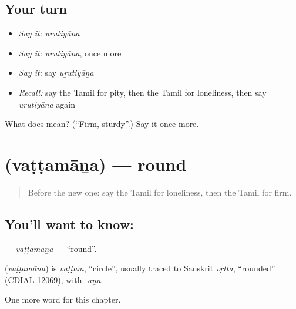 \subsection*{Your turn}
\begin{itemize}
\raggedright
  \item \emph{Say it:} \emph{uṟutiyāṉa}
  \item \emph{Say it:} \emph{uṟutiyāṉa}, once more
  \item \emph{Say it:} say \emph{uṟutiyāṉa}
  \item \emph{Recall:} say the Tamil for pity, then the Tamil for loneliness, then say \emph{uṟutiyāṉa} again
\end{itemize}

\begin{tcolorbox}[breakable,colback=teal!4,colframe=teal!35!black,title={Before you move on}]
What does  mean? (\textquotedblleft{}Firm, sturdy\textquotedblright{}.) Say it once more.
\end{tcolorbox}
\section[\texorpdfstring{\ta{வட்டமான} (vaṭṭamāṉa)}{வட்டமான (vaṭṭamāṉa)}]{ (vaṭṭamāṉa) — round}

\label{lesson:TA-C240-vattamana}



\begin{quote}
Before the new one: say the Tamil for loneliness, then the Tamil for firm.
\end{quote}

\subsection*{You'll want to know: }
\textbf{} — \emph{vaṭṭamāṉa} — \textquotedblleft{}round\textquotedblright{}.

\begin{cousinweb}
\textbf{} (\emph{vaṭṭamāṉa}) is \emph{vaṭṭam}, \textquotedblleft{}circle\textquotedblright{}, usually traced to Sanskrit \emph{vṛtta}, \textquotedblleft{}rounded\textquotedblright{} (CDIAL 12069), with \emph{-āṉa}.
\end{cousinweb}

\begin{grammarlens}[title={What you've built}]
One more word for this chapter.
\end{grammarlens}

